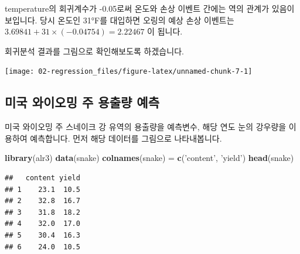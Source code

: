 \documentclass[12pt,]{book}
\newenvironment{Shaded}{\begin{snugshade}}{\end{snugshade}}
\newcommand{\DataTypeTok}[1]{\textcolor[rgb]{0.13,0.29,0.53}{#1}}
\newcommand{\DecValTok}[1]{\textcolor[rgb]{0.00,0.00,0.81}{#1}}
\newcommand{\KeywordTok}[1]{\textcolor[rgb]{0.13,0.29,0.53}{\textbf{#1}}}
\newcommand{\NormalTok}[1]{#1}
\newcommand{\OperatorTok}[1]{\textcolor[rgb]{0.81,0.36,0.00}{\textbf{#1}}}
\newcommand{\StringTok}[1]{\textcolor[rgb]{0.31,0.60,0.02}{#1}}
\begin{document}
temperature의 회귀계수가 -0.05로써 온도와 손상 이벤트 간에는 역의 관계가 있음이 보입니다. 당시 온도인 31°F를 대입하면 오링의 예상 손상 이벤트는 \(3.69841 + 31 \times (-0.04754) = 2.22467\) 이 됩니다.

회귀분석 결과를 그림으로 확인해보도록 하겠습니다.

\begin{Shaded}
\end{Shaded}

\begin{center}\texttt{[image: 02-regression\_files/figure-latex/unnamed-chunk-7-1]} \end{center}

\hypertarget{uxbbf8uxad6d-uxc640uxc774uxc624uxbc0d-uxc8fc-uxc6a9uxcd9cuxb7c9-uxc608uxce21}{%
\subsection{미국 와이오밍 주 용출량 예측}\label{uxbbf8uxad6d-uxc640uxc774uxc624uxbc0d-uxc8fc-uxc6a9uxcd9cuxb7c9-uxc608uxce21}}

미국 와이오밍 주 스네이크 강 유역의 용출량을 예측변수, 해당 연도 눈의 강우량을 이용하여 예측합니다. 먼저 해당 데이터를 그림으로 나타내봅니다.

\begin{Shaded}
\begin{Highlighting}[]
\KeywordTok{library}\NormalTok{(alr3)}
\KeywordTok{data}\NormalTok{(snake)}
\KeywordTok{colnames}\NormalTok{(snake) =}\StringTok{ }\KeywordTok{c}\NormalTok{(}\StringTok{'content'}\NormalTok{, }\StringTok{'yield'}\NormalTok{)}
\KeywordTok{head}\NormalTok{(snake)}
\end{Highlighting}
\end{Shaded}

\begin{verbatim}
##   content yield
## 1    23.1  10.5
## 2    32.8  16.7
## 3    31.8  18.2
## 4    32.0  17.0
## 5    30.4  16.3
## 6    24.0  10.5
\end{verbatim}
\end{document}

